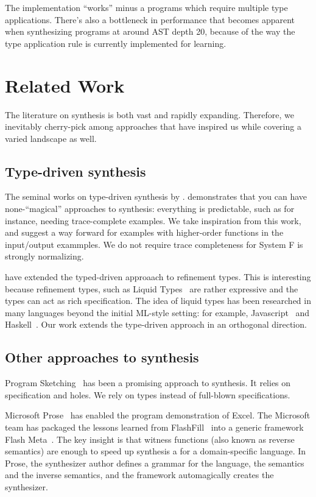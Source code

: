\documentclass[acmsmall]{acmart}
\theoremstyle{mytheoremstyle}
\begin{document}
The implementation ``works'' minus a programs which require multiple type applications. There's also a bottleneck in performance that becomes apparent when synthesizing programs at around AST depth 20, because of the way the type application rule is currently implemented for learning.

\section{Related Work}

The literature on synthesis is both vast and rapidly expanding. Therefore, we inevitably cherry-pick among approaches that have inspired us while covering a varied landscape as well.

\subsection{Type-driven synthesis}

The seminal works on type-driven synthesis by \citet{osera2015program}. demonstrates that you can have none-``magical'' approaches to synthesis: everything is predictable, such as for instance, needing trace-complete examples. We take inspiration from this work, and suggest a way forward for examples with higher-order functions in the input/output exammples. We do not require trace completeness for System F is strongly normalizing.

\citet{polikarpova2016program} have extended the typed-driven approaach to refinement types. This is interesting because refinement types, such as Liquid Types~\cite{rondon2012liquid} are rather expressive and the types can act as rich specification. The idea of liquid types has been researched in many languages beyond the initial ML-style setting: for example, Javascript~\cite{chugh2012nested} and Haskell~\cite{liquidhaskell}. Our work extends the type-driven approach in an orthogonal direction.

\subsection{Other approaches to synthesis}

Program Sketching~\cite{solar2008program} has been a promising approach to synthesis. It relies on specification and holes. We rely on types instead of full-blown specifications.

Microsoft Prose~\cite{msprose} has enabled the program demonstration of
Excel. The Microsoft team has packaged the lessons learned from
FlashFill~\cite{gulwani2011automating}  into a generic framework Flash Meta~\cite{flashmeta}. The key
insight is that witness functions (also known as reverse semantics)
are enough to speed up synthesis a for a domain-specific language. In
Prose, the synthesizer author defines a grammar for the language, the
semantics and the inverse semantics, and the framework automagically
creates the synthesizer.
\end{document}
